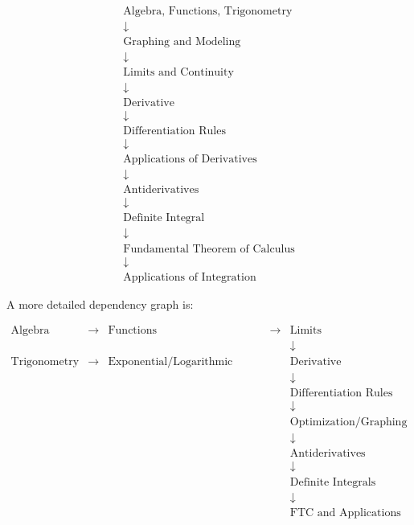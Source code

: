 \documentclass[11pt]{article}
\begin{document}
\[
\begin{array}{c}
\text{Algebra, Functions, Trigonometry} \\[3pt]
\downarrow \\[3pt]
\text{Graphing and Modeling} \\[3pt]
\downarrow \\[3pt]
\text{Limits and Continuity} \\[3pt]
\downarrow \\[3pt]
\text{Derivative} \\[3pt]
\downarrow \\[3pt]
\text{Differentiation Rules} \\[3pt]
\downarrow \\[3pt]
\text{Applications of Derivatives} \\[3pt]
\downarrow \\[3pt]
\text{Antiderivatives} \\[3pt]
\downarrow \\[3pt]
\text{Definite Integral} \\[3pt]
\downarrow \\[3pt]
\text{Fundamental Theorem of Calculus} \\[3pt]
\downarrow \\[3pt]
\text{Applications of Integration}
\end{array}
\]

A more detailed dependency graph is:

\[
\boxed{
\begin{array}{ccccc}
\text{Algebra} & \rightarrow & \text{Functions} &
\rightarrow & \text{Limits} \\[3pt]
&&&& \downarrow \\[3pt]
\text{Trigonometry} & \rightarrow & \text{Exponential/Logarithmic Functions}
&& \text{Derivative} \\[3pt]
&&&& \downarrow \\[3pt]
&&&& \text{Differentiation Rules} \\[3pt]
&&&& \downarrow \\[3pt]
&&&& \text{Optimization/Graphing} \\[3pt]
&&&& \downarrow \\[3pt]
&&&& \text{Antiderivatives} \\[3pt]
&&&& \downarrow \\[3pt]
&&&& \text{Definite Integrals} \\[3pt]
&&&& \downarrow \\[3pt]
&&&& \text{FTC and Applications}
\end{array}
}
\]
\end{document}
